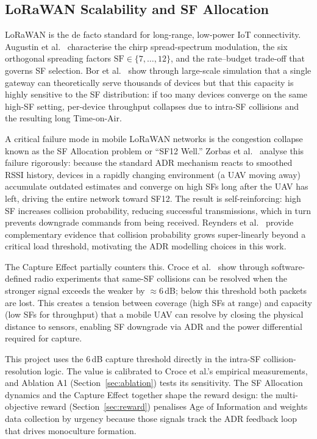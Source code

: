\subsection{LoRaWAN Scalability and SF Allocation}

LoRaWAN is the de facto standard for long-range, low-power IoT
connectivity. Augustin et al.~\cite{augustin2016lora} characterise
the chirp spread-spectrum modulation, the six orthogonal spreading
factors $\mathrm{SF}\in\{7,\ldots,12\}$, and the rate--budget
trade-off that governs SF selection. Bor et al.~\cite{bor2016lora}
show through large-scale simulation that a single gateway can
theoretically serve thousands of devices but that this capacity is
highly sensitive to the SF distribution: if too many devices converge
on the same high-SF setting, per-device throughput collapses due to
intra-SF collisions and the resulting long Time-on-Air.

A critical failure mode in mobile LoRaWAN networks is the congestion
collapse known as the SF Allocation problem or ``SF12 Well.'' Zorbas et
al.~\cite{zorbas2025revisiting} analyse this failure rigorously:
because the standard ADR mechanism reacts to smoothed RSSI history,
devices in a rapidly changing environment (a UAV moving away)
accumulate outdated estimates and converge on high SFs long after
the UAV has left, driving the entire network toward SF12. The result
is self-reinforcing: high SF increases collision probability,
reducing successful transmissions, which in turn prevents downgrade
commands from being received. Reynders et
al.~\cite{reynders2016range} provide complementary evidence that
collision probability grows super-linearly beyond a critical load
threshold, motivating the ADR modelling choices in this work.

The Capture Effect partially counters this. Croce et al.~\cite{croce2020lora} show through software-defined radio experiments that same-SF collisions can be resolved when the stronger signal exceeds the weaker by $\approx 6$\,dB; below this threshold both packets are lost. This creates a tension between coverage (high SFs at range) and capacity (low SFs for throughput) that a mobile UAV can resolve by closing the physical distance to sensors, enabling SF downgrade via ADR and the power differential required for capture.

This project uses the $6$\,dB capture threshold directly in the intra-SF collision-resolution logic. The value is calibrated to Croce et al.'s empirical measurements, and Ablation A1 (Section~\ref{sec:ablation}) tests its sensitivity. The SF Allocation dynamics and the Capture Effect together shape the reward design: the multi-objective reward (Section~\ref{sec:reward}) penalises Age of Information and weights data collection by urgency because those signals track the ADR feedback loop that drives monoculture formation.
